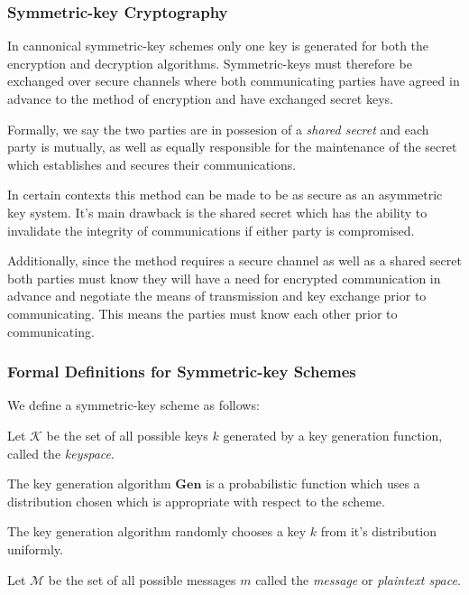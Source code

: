 \subsubsection{Symmetric-key Cryptography} 

In cannonical symmetric-key schemes only one key is generated for both the encryption and decryption algorithms. Symmetric-keys must therefore be exchanged over secure channels where both communicating parties have agreed in advance to the method of encryption and have exchanged secret keys. 


Formally, we say the two parties are in possesion of a \textit{shared secret} and each party is mutually, as well as equally responsible for the maintenance of the secret which establishes and secures their communications. 

 In certain contexts this method can be made to be as secure as an asymmetric key system. It's main drawback is the shared secret which has the ability to invalidate the integrity of communications if either party is compromised.


Additionally, since the method requires a secure channel as well as a shared secret both parties must know they will have a need for encrypted communication in advance and negotiate the means of transmission and key exchange prior to communicating. This means the parties must know each other prior to communicating. 



\subsubsection*{Formal Definitions for Symmetric-key Schemes}


We define a symmetric-key scheme as follows:


Let $\mathbf{\mathcal{K}}$ be the set of all possible keys $k$  generated by a key generation function, called the \textit{keyspace}.

The key generation algorithm $\mathbf{Gen}$ is a probabilistic function which uses a distribution chosen which is appropriate with respect to the scheme.

The key generation algorithm randomly chooses a key $k$ from it's distribution uniformly. 


Let $\mathbf{\mathcal{M}}$ be the set of all possible messages $m$ called the \textit{message} or \textit{{plaintext space}}.


